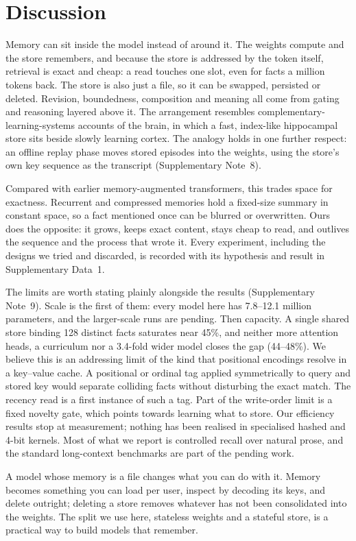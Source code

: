 \section*{Discussion}

Memory can sit inside the model instead of around it. The weights compute and the store
remembers, and because the store is addressed by the token itself, retrieval is exact and
cheap: a read touches one slot, even for facts a million tokens back. The store is also
just a file, so it can be swapped, persisted or deleted. Revision, boundedness, composition and
meaning all come from gating and reasoning layered above it. The arrangement
resembles complementary-learning-systems accounts of the brain, in which a fast, index-like
hippocampal store sits beside slowly learning cortex\cite{teyler1986indexing,mcclelland1995cls,kumaran2016cls}.
The analogy holds in one further respect: an offline replay phase moves stored episodes
into the weights, using the store's own key sequence as the transcript (Supplementary Note~8).

Compared with earlier memory-augmented transformers, this trades space for exactness.
Recurrent and compressed memories\cite{bulatov2022rmt,rae2020compressive,wu2022memformer} hold
a fixed-size summary in constant space, so a fact mentioned once can be blurred or
overwritten. Ours does the opposite: it grows, keeps exact content, stays cheap to read,
and outlives the sequence and the process that wrote it. Every experiment, including the designs we
tried and discarded, is recorded with its hypothesis and result in Supplementary Data~1.

The limits are worth stating plainly alongside the results (Supplementary Note~9). Scale is the first
of them: every model here has 7.8--12.1 million parameters, and the larger-scale runs are
pending. Then capacity. A single shared store binding 128 distinct facts saturates
near 45\%, and neither more attention heads, a curriculum nor a 3.4-fold wider model closes
the gap (44--48\%). We believe this is an addressing limit of the kind that positional
encodings resolve in a key--value cache. A positional or ordinal tag applied symmetrically
to query and stored key would separate colliding facts without disturbing the exact match.
The recency read is a first instance of such a tag. Part of the write-order limit is a
fixed novelty gate, which points towards learning what to store. Our efficiency results
stop at measurement; nothing has been realised in specialised hashed and 4-bit kernels.
Most of what we report is controlled recall over natural prose, and the standard long-context
benchmarks\cite{kuratov2024babilong,hsieh2024ruler} are part of the pending work.

A model whose memory is a file changes what you can do with it. Memory becomes something
you can load per user, inspect by decoding its keys, and delete outright; deleting a store
removes whatever has not been consolidated into the weights. The split we use here,
stateless weights and a stateful store, is a practical way to build models that remember.